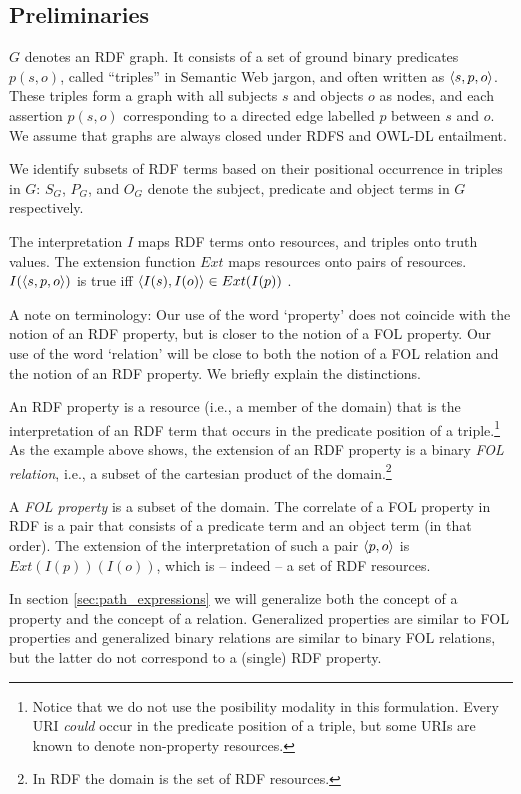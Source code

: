 \subsection{Preliminaries}
\label{sec:preliminaries}


$G$ denotes an RDF graph. It consists of a set of ground binary
predicates $p(s,o)$, called ``triples'' in Semantic Web jargon, and often
written as $\langle s,p,o\rangle$. These triples form a graph with all
subjects $s$ and objects $o$ as nodes, and 
each assertion $p(s,o)$ corresponding to a directed edge labelled $p$
between $s$ and $o$. 
We assume that graphs are always closed under
  RDFS and OWL-DL entailment.

We identify subsets of RDF terms based on
  their positional occurrence in triples in $G$:
  $S_G$, $P_G$, and $O_G$ denote the subject, predicate and object terms
  in $G$ respectively.

The interpretation $I$ maps RDF terms onto resources,
  and triples onto truth values.
The extension function $Ext$ maps resources onto pairs of resources.
$I(\langle s,p,o\rangle)$ is true iff
  $\langle I(s),I(o)\rangle \in Ext(I(p))$ \cite{Hayes2004}.

A note on terminology: Our use of the word `property' does not coincide
  with the notion of an RDF property, but is closer to the notion
  of a FOL property. Our use of the word `relation' will be close to
  both the notion of a FOL relation and the notion of an RDF property.
  We briefly explain the distinctions.

An RDF property is a resource (i.e., a member of the domain)
  that is the interpretation of
  an RDF term that occurs in the predicate position of a triple.\footnote{
    Notice that we do not use the posibility modality in this formulation.
    Every URI \emph{could} occur in the predicate position of a triple,
      but some URIs are known to denote non-property resources.
  }
As the example above shows, the extension of an RDF property is
  a binary \emph{FOL relation},
  i.e., a subset of the cartesian product of the domain.\footnote{
    In RDF the domain is the set of RDF resources.}

A \emph{FOL property} is a subset of the domain.
The correlate of a FOL property in RDF is a pair that consists of
  a predicate term and an object term (in that order).
The extension of the interpretation of such a pair $\langle p,o\rangle$
  is $Ext(I(p))(I(o))$, which is -- indeed -- a set of RDF resources.

In section \ref{sec:path_expressions} we will generalize
  both the concept of a property and the concept of a relation.
Generalized properties are similar to FOL properties
  and generalized binary relations are similar to binary FOL relations,
  but the latter do not correspond to a (single) RDF property.

\begin{comment}
$\equivset{x}$ is the equivalence class for $x$
  under equivalence relation $\approx$.
\end{comment}

